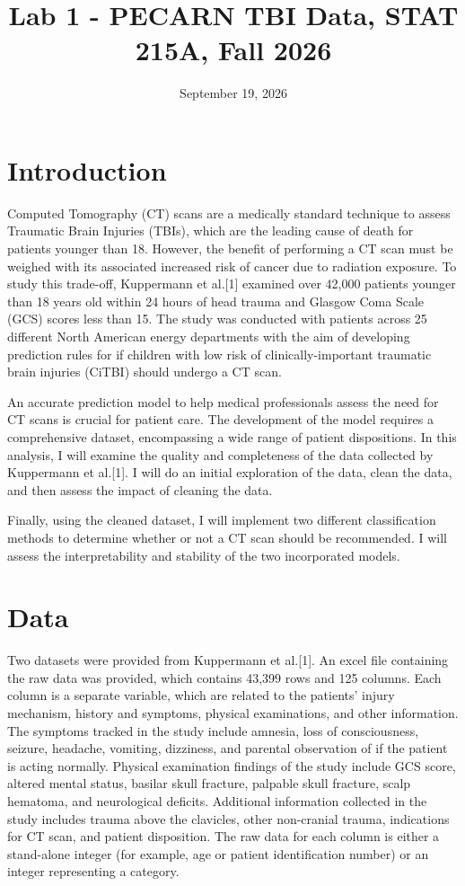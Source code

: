 \documentclass[10pt,letterpaper]{article}
\title{Lab 1 - PECARN TBI Data, STAT 215A, Fall 2026}
\author{}
\date{September 19, 2026}
\begin{document}
\maketitle



\section{Introduction}\label{introduction}

Computed Tomography (CT) scans are a medically standard technique to assess Traumatic Brain Injuries (TBIs), which are the leading cause of death for patients younger than 18. However, the benefit of performing a CT scan must be weighed with its associated increased risk of cancer due to radiation exposure. To study this trade-off, Kuppermann et al.[1] examined over 42,000 patients younger than 18 years old within 24 hours of head trauma and Glasgow Coma Scale (GCS) scores less than 15. The study was conducted with patients across 25 different North American energy departments with the aim of developing prediction rules for if children with low risk of clinically-important traumatic brain injuries (CiTBI) should undergo a CT scan. 

An accurate prediction model to help medical professionals assess the need for CT scans is crucial for patient care.  The development of the model requires a comprehensive dataset,  encompassing a wide range of patient dispositions.  In this analysis, I will examine the quality and completeness of the data collected by Kuppermann et al.[1]. I will do an initial exploration of the data, clean the data, and then assess the impact of cleaning the data. 

Finally, using the cleaned dataset, I will implement two different classification methods to determine whether or not a CT scan should be recommended. I will assess the interpretability and stability of the two incorporated models.

\section{Data}\label{data}
Two datasets were provided from Kuppermann et al.[1].  An excel file containing the raw data was provided, which contains 43,399 rows and 125 columns. Each column is a separate variable, which are related to the patients' injury mechanism, history and symptoms, physical examinations, and other information. The symptoms tracked in the study include amnesia, loss of consciousness, seizure, headache, vomiting, dizziness, and parental observation of if the patient is acting normally. Physical examination findings of the study include GCS score, altered mental status, basilar skull fracture, palpable skull fracture, scalp hematoma, and neurological deficits. Additional information collected in the study includes trauma above the clavicles, other non-cranial trauma, indications for CT scan, and patient disposition. The raw data for each column is either a stand-alone integer (for example, age or patient identification number) or an integer representing a category.
\end{document}
